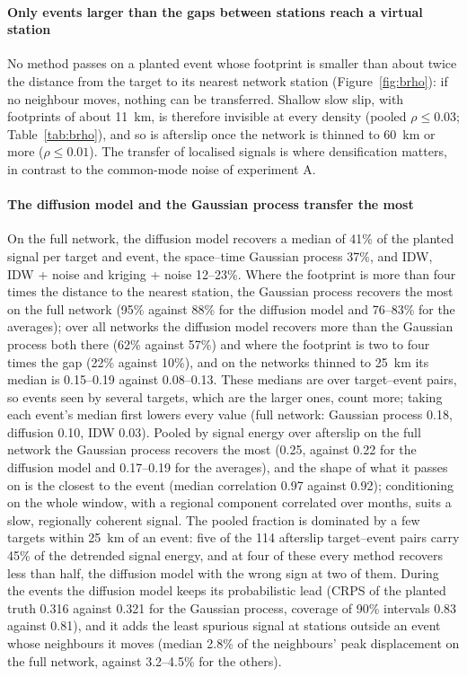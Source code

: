 \documentclass[preprint,12pt,authoryear]{elsarticle}
\begin{document}
\paragraph{Only events larger than the gaps between stations reach a virtual station} No
method passes on a planted event whose footprint is smaller than about twice the distance
from the target to its nearest network station (Figure~\ref{fig:brho}): if no neighbour
moves, nothing can be transferred. Shallow slow slip, with footprints of about 11~km, is
therefore invisible at every density (pooled $\rho \le 0.03$; Table~\ref{tab:brho}), and
so is afterslip once the network is thinned to 60~km or more ($\rho \le 0.01$). The
transfer of localised signals is where densification matters, in contrast to the
common-mode noise of experiment A.

\paragraph{The diffusion model and the Gaussian process transfer the most} On the full
network, the diffusion model recovers a median of 41\% of the planted signal per target
and event, the space--time Gaussian process 37\%, and IDW, IDW + noise and kriging +
noise 12--23\%. Where the footprint is more than four times the distance to the nearest
station, the Gaussian process recovers the most on the full network (95\% against 88\%
for the diffusion model and 76--83\% for the averages); over all networks the diffusion
model recovers more than the Gaussian process both there (62\% against 57\%) and where
the footprint is two to four times the gap (22\% against 10\%), and on the networks
thinned to 25~km its median is 0.15--0.19 against 0.08--0.13. These medians are over
target--event pairs, so events seen by several targets, which are the larger ones, count
more; taking each event's median first lowers every value (full network: Gaussian process
0.18, diffusion 0.10, IDW 0.03). Pooled by signal energy over afterslip on the full
network the Gaussian process recovers the most (0.25, against 0.22 for the diffusion
model and 0.17--0.19 for the averages), and the shape of what it passes on is the closest
to the event (median correlation 0.97 against 0.92); conditioning on the whole window,
with a regional component correlated over months, suits a slow, regionally coherent
signal. The pooled fraction is dominated by a few targets within 25~km of an event: five
of the 114 afterslip target--event pairs carry 45\% of the detrended signal energy, and
at four of these every method recovers less than half, the diffusion model with the wrong
sign at two of them. During the events the diffusion model keeps its probabilistic lead
(CRPS of the planted truth 0.316 against 0.321 for the Gaussian process, coverage of 90\%
intervals 0.83 against 0.81), and it adds the least spurious signal at stations outside
an event whose neighbours it moves (median 2.8\% of the neighbours' peak displacement on
the full network, against 3.2--4.5\% for the others).
\end{document}
